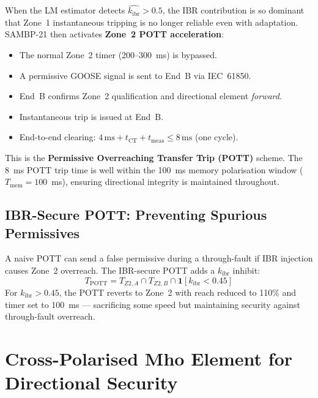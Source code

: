 \documentclass[12pt,a4paper]{article}
\newcommand{\kibr}{k_\mathrm{ibr}}
\begin{document}
When the LM estimator detects $\hat{\kibr} > 0.5$, the IBR contribution is so dominant that Zone~1 instantaneous tripping is no longer reliable even with adaptation. SAMBP-21 then activates \textbf{Zone~2 POTT acceleration}:
\begin{itemize}
  \item The normal Zone~2 timer (200--300~ms) is bypassed.
  \item A permissive GOOSE signal is sent to End~B via IEC~61850.
  \item End~B confirms Zone~2 qualification and directional element \emph{forward}.
  \item Instantaneous trip is issued at End~B.
  \item End-to-end clearing: $4\,\mathrm{ms} + t_\mathrm{CT} + t_\mathrm{meas} \leq 8\,\mathrm{ms}$ (one cycle).
\end{itemize}
This is the \textbf{Permissive Overreaching Transfer Trip (POTT)} scheme. The 8~ms POTT trip time is well within the 100~ms memory polarisation window ($T_\mathrm{mem} = 100$~ms), ensuring directional integrity is maintained throughout.

\subsection{IBR-Secure POTT: Preventing Spurious Permissives}

A naive POTT can send a false permissive during a through-fault if IBR injection causes Zone~2 overreach. The IBR-secure POTT adds a $\kibr$ inhibit:
\begin{equation}
  T_\mathrm{POTT} = T_{Z2,A} \cap T_{Z2,B} \cap \mathbf{1}\!\left[\kibr < 0.45\right]
  \label{eq:pott_ibr}
\end{equation}
For $\kibr > 0.45$, the POTT reverts to Zone~2 with reach reduced to 110\% and timer set to 100~ms --- sacrificing some speed but maintaining security against through-fault overreach.

\section{Cross-Polarised Mho Element for Directional Security}
\end{document}
